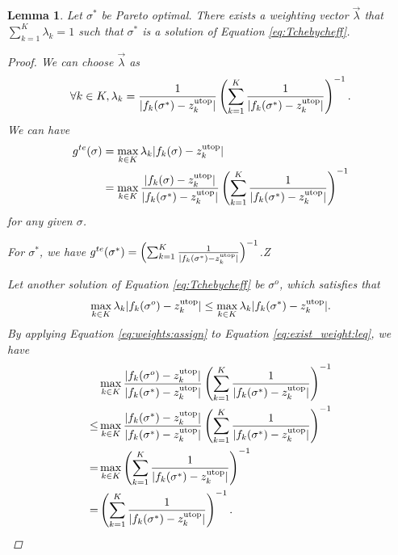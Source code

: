 \documentclass{article}
\newtheorem{lem}{Lemma}
\begin{document}
\begin{lem}
\label{lem:exist_weight}
Let $ \sigma^{*} $ be Pareto optimal.
There exists a weighting vector $ \vec{\lambda} $ that $ \sum_{k=1}^{K} \lambda_{k} = 1 $ such that $ \sigma^{*} $ is a solution of Equation \eqref{eq:Tchebycheff}.
\begin{proof}
We can choose  $ \vec{\lambda} $ as 
\begin{equation}
\label{eq:weights:assign}
\forall k \in K,
\lambda_{k} = \frac{1}{ | f_{k} ( \sigma^{*} ) - z^{\rm utop}_{k} | } \left( \sum_{k=1}^{K} \frac{1}{ | f_{k} ( \sigma^{*} ) - z^{\rm utop}_{k} | }  \right)^{-1} .
\end{equation}
We can have 
\begin{equation}
\begin{aligned}
 g^{te} ( \sigma ) & =  \max_{k \in K} \lambda_{k} | f_{k}( \sigma ) - z^{\rm utop}_{k} | \\
&  =  \max_{k \in K} \frac{ | f_{k}( \sigma ) - z^{\rm utop}_{k} |  }{ | f_{k} ( \sigma^{*} ) - z^{\rm utop}_{k} | } \left( \sum_{k=1}^{K} \frac{1}{ | f_{k} ( \sigma^{*} ) - z^{\rm utop}_{k} | }  \right)^{-1}
\end{aligned}
\end{equation}
for any given $ \sigma $.

For $ \sigma^{*} $, we have $ g^{te} ( \sigma^{*} ) = \left( \sum_{k=1}^{K} \frac{1}{ | f_{k} ( \sigma^{*} ) - z^{\rm utop}_{k} | }  \right)^{-1} $.Z



Let another solution of Equation \eqref{eq:Tchebycheff} be $ \sigma^{o} $, which satisfies that
\begin{equation}
\label{eq:exist_weight:leq}
\max_{k \in K} \lambda_{k} | f_{k}( \sigma^{o} ) - z^{\rm utop}_{k} | \leq \max_{k \in K} \lambda_{k} | f_{k}( \sigma^{*} ) - z^{\rm utop}_{k} |.
\end{equation}
By applying Equation \eqref{eq:weights:assign} to Equation \eqref{eq:exist_weight:leq}, we have
\begin{equation}
\begin{aligned}
& \max_{k \in K} \frac{ | f_{k}( \sigma^{o} ) - z^{\rm utop}_{k} |  }{ | f_{k} ( \sigma^{*} ) - z^{\rm utop}_{k} | } \left( \sum_{k=1}^{K} \frac{1}{ | f_{k} ( \sigma^{*} ) - z^{\rm utop}_{k} | }  \right)^{-1} \\
\leq & \max_{k \in K} \frac{ | f_{k}( \sigma^{*} ) - z^{\rm utop}_{k} | }{ | f_{k} ( \sigma^{*} ) - z^{\rm utop}_{k} | } \left( \sum_{k=1}^{K} \frac{1}{ | f_{k} ( \sigma^{*} ) - z^{\rm utop}_{k} | }  \right)^{-1} \\ 
= & \max_{k \in K} \left( \sum_{k=1}^{K} \frac{1}{ | f_{k} ( \sigma^{*} ) - z^{\rm utop}_{k} | }  \right)^{-1} \\
= & \left( \sum_{k=1}^{K} \frac{1}{ | f_{k} ( \sigma^{*} ) - z^{\rm utop}_{k} | }  \right)^{-1}.
\end{aligned}
\end{equation}
\end{proof}
\end{lem}
\end{document}
